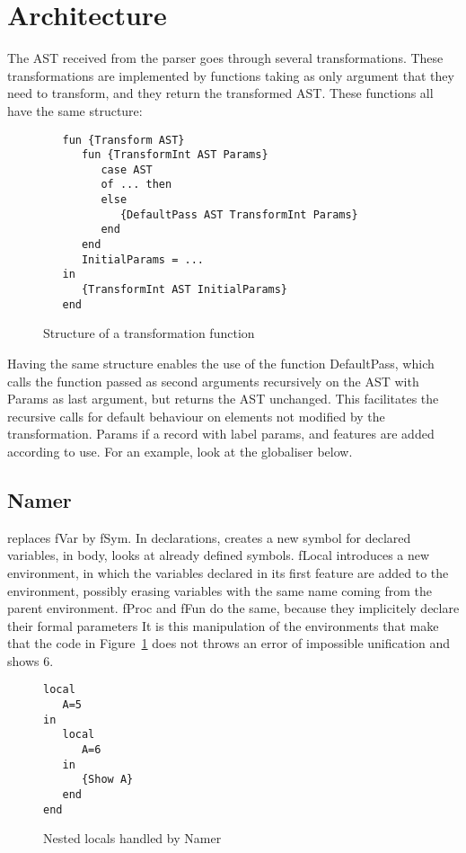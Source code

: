 \documentclass[a4paper]{memoir}
\begin{document}
\section{Architecture}
The AST received from the parser goes through several transformations. These transformations are implemented by functions taking as only argument that they need to transform, and they return the transformed AST.
These functions all have the same structure:
\begin{figure}[h]
\begin{lstlisting}
   fun {Transform AST}
      fun {TransformInt AST Params}
         case AST
         of ... then
         else
            {DefaultPass AST TransformInt Params}
         end
      end
      InitialParams = ...
   in
      {TransformInt AST InitialParams}
   end
\end{lstlisting}
\caption{Structure of a transformation function}
\end{figure}
Having the same structure enables the use of the function DefaultPass, which calls the function passed as second arguments recursively on the AST with Params as last argument, but returns the AST unchanged. This facilitates the recursive calls for default behaviour on elements not modified by the transformation.
Params if a record with label params, and features are added according to use. For an example, look at the globaliser below.%
\subsection{Namer}
replaces fVar by fSym. In declarations, creates a new symbol for declared variables, in body, looks at already defined symbols.
fLocal introduces a new environment, in which the variables declared in its first feature are added to the environment, possibly erasing variables with the same name coming from the parent environment.
fProc and fFun do the same, because they implicitely declare their formal parameters %
It is this manipulation of the environments that make that the code in Figure~\ref{fig:namer_nested_locals} does not throws an error of impossible unification and shows 6.
\begin{figure}
\begin{lstlisting}
local
   A=5
in
   local 
      A=6
   in
      {Show A}
   end
end
\end{lstlisting}
\caption{Nested locals handled by Namer}
\label{fig:namer_nested_locals}
\end{figure}
\end{document}

